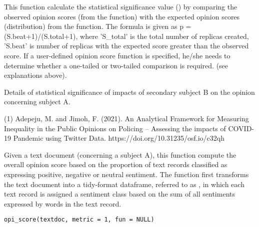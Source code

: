 \documentclass[a4paper]{book}
\begin{document}
%
\begin{Details}\relax
This function calculate the statistical
significance value () by comparing the
observed opinion scores (from the 
function) with the expected opinion scores (distribution) from the
 function. The formula is given as
p = (S.beat+1)/(S.total+1), where 'S\_total' is the total
number of replicas created, 'S.beat' is number of replicas
with the expected score greater than the observed score. If a user-defined opinion
score function is specified, he/she needs to determine
whether a one-tailed or two-tailed comparison is required.
(see explanations above).
\end{Details}
%
\begin{Value}
Details of statistical significance of impacts
of secondary subject B on the opinion concerning subject A.
\end{Value}
%
\begin{References}\relax
(1) Adepeju, M. and Jimoh, F. (2021). An Analytical
Framework for Measuring Inequality in the Public Opinions on
Policing – Assessing the impacts of COVID-19 Pandemic using
Twitter Data. https://doi.org/10.31235/osf.io/c32qh
\end{References}
%
\begin{Description}\relax
Given a text document (concerning a subject A),
this function compute the overall opinion score based on the
proportion of text records classified as expressing positive,
negative or neutral sentiment. The function first transforms
the text document into a tidy-format dataframe, referred to
as , in which each text
record is assigned a sentiment class based on the sum of all
sentiments expressed by words in the text record.
\end{Description}
%
\begin{Usage}
\begin{verbatim}
opi_score(textdoc, metric = 1, fun = NULL)
\end{verbatim}
\end{Usage}
%
\end{document}
